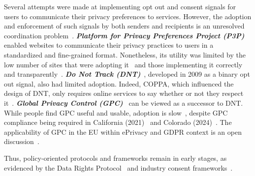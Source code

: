 \label{sec:policy-solutions}
Several attempts were made at implementing opt out and consent signals for users to communicate their privacy preferences to services. However, the adoption and enforcement of such signals by both senders and recipients is an unresolved coordination problem~\cite{hilsPrivacyPreferenceSignals2021}.
%
\textbf{\textit{Platform for Privacy Preferences Project (P3P)}}~\cite{reaglePlatformPrivacyPreferences1999,cranorPlatformPrivacyPreferences2002,cranorPlatformPrivacyPreferences2006} enabled websites to communicate their privacy practices to users in a standardized and fine-grained format. Nonetheless, its utility was limited by the low number of sites that were adopting it~\cite{cranorUseP3PUser2002} and those implementing it correctly and transparently~\cite{cranorAnalysisP3PDeployment2003, leonTokenAttemptMisrepresentation2010}.
%
\textbf{\textit{Do Not Track (DNT)}}~\cite{fieldingTrackingPreferenceExpression2019}, developed in 2009 as a binary opt out signal, also had limited adoption. Indeed, COPPA, which influenced the design of DNT, only requires online services to say whether or not they respect it~\cite{CaliforniaCodeBPC2003}.
%
\textbf{\textit{Global Privacy Control (GPC)}}~\cite{zimmeckGlobalPrivacyControl2024} can be viewed as a successor to DNT. While people find GPC useful and usable, adoption is slow~\cite{zimmeckUsabilityEnforceabilityGlobal2023,zimmeckGeneralizableActivePrivacy2024}, despite GPC compliance being required in California (2021)~\cite{attorneygeneralbecerraCCPARequiresBusinesses2021,bontaAttorneyGeneralBonta2022} and Colorado (2024)~\cite{coloradodepartmentoflawUniversalOptOutShortlist2024}. The applicability of GPC in the EU within ePrivacy and GDPR context is an open discussion~\cite{berjonGPCGDPR2021}.

Thus, policy-oriented protocols and frameworks remain in early stages, as evidenced by the Data Rights Protocol~\cite{consumerreportsDataRightsProtocol2024} and industry consent frameworks~\cite{iabtechlabGlobalPrivacyPlatform2024}.
